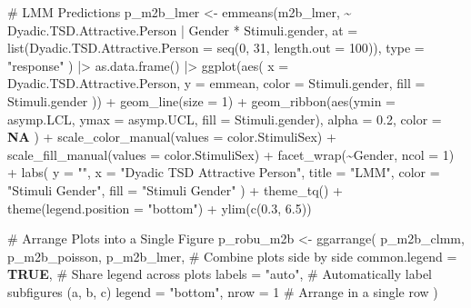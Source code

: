 \documentclass[
  bookmarksnumbered]{article}
\newenvironment{Shaded}{\begin{snugshade}}{\end{snugshade}}
\newcommand{\AttributeTok}[1]{\textcolor[rgb]{0.80,0.80,0.80}{#1}}
\newcommand{\CommentTok}[1]{\textcolor[rgb]{0.50,0.62,0.50}{#1}}
\newcommand{\ConstantTok}[1]{\textcolor[rgb]{0.86,0.64,0.64}{\textbf{#1}}}
\newcommand{\DecValTok}[1]{\textcolor[rgb]{0.86,0.86,0.80}{#1}}
\newcommand{\FloatTok}[1]{\textcolor[rgb]{0.75,0.75,0.82}{#1}}
\newcommand{\FunctionTok}[1]{\textcolor[rgb]{0.94,0.94,0.56}{#1}}
\newcommand{\NormalTok}[1]{\textcolor[rgb]{0.80,0.80,0.80}{#1}}
\newcommand{\OtherTok}[1]{\textcolor[rgb]{0.94,0.94,0.56}{#1}}
\newcommand{\SpecialCharTok}[1]{\textcolor[rgb]{0.86,0.64,0.64}{#1}}
\newcommand{\StringTok}[1]{\textcolor[rgb]{0.80,0.58,0.58}{#1}}
\begin{document}
\begin{Shaded}
\begin{Highlighting}[]
\CommentTok{\# LMM Predictions}
\NormalTok{p\_m2b\_lmer }\OtherTok{\textless{}{-}} \FunctionTok{emmeans}\NormalTok{(m2b\_lmer, }\SpecialCharTok{\textasciitilde{}}\NormalTok{ Dyadic.TSD.Attractive.Person }\SpecialCharTok{|}\NormalTok{ Gender }\SpecialCharTok{*}\NormalTok{ Stimuli.gender,}
  \AttributeTok{at =} \FunctionTok{list}\NormalTok{(}\AttributeTok{Dyadic.TSD.Attractive.Person =} \FunctionTok{seq}\NormalTok{(}\DecValTok{0}\NormalTok{, }\DecValTok{31}\NormalTok{, }\AttributeTok{length.out =} \DecValTok{100}\NormalTok{)),}
  \AttributeTok{type =} \StringTok{"response"}
\NormalTok{) }\SpecialCharTok{|\textgreater{}}
  \FunctionTok{as.data.frame}\NormalTok{() }\SpecialCharTok{|\textgreater{}}
  \FunctionTok{ggplot}\NormalTok{(}\FunctionTok{aes}\NormalTok{(}
    \AttributeTok{x =}\NormalTok{ Dyadic.TSD.Attractive.Person, }\AttributeTok{y =}\NormalTok{ emmean,}
    \AttributeTok{color =}\NormalTok{ Stimuli.gender, }\AttributeTok{fill =}\NormalTok{ Stimuli.gender}
\NormalTok{  )) }\SpecialCharTok{+}
  \FunctionTok{geom\_line}\NormalTok{(}\AttributeTok{size =} \DecValTok{1}\NormalTok{) }\SpecialCharTok{+}
  \FunctionTok{geom\_ribbon}\NormalTok{(}\FunctionTok{aes}\NormalTok{(}\AttributeTok{ymin =}\NormalTok{ asymp.LCL, }\AttributeTok{ymax =}\NormalTok{ asymp.UCL, }\AttributeTok{fill =}\NormalTok{ Stimuli.gender),}
    \AttributeTok{alpha =} \FloatTok{0.2}\NormalTok{, }\AttributeTok{color =} \ConstantTok{NA}
\NormalTok{  ) }\SpecialCharTok{+}
  \FunctionTok{scale\_color\_manual}\NormalTok{(}\AttributeTok{values =}\NormalTok{ color.StimuliSex) }\SpecialCharTok{+}
  \FunctionTok{scale\_fill\_manual}\NormalTok{(}\AttributeTok{values =}\NormalTok{ color.StimuliSex) }\SpecialCharTok{+}
  \FunctionTok{facet\_wrap}\NormalTok{(}\SpecialCharTok{\textasciitilde{}}\NormalTok{Gender, }\AttributeTok{ncol =} \DecValTok{1}\NormalTok{) }\SpecialCharTok{+}
  \FunctionTok{labs}\NormalTok{(}
    \AttributeTok{y =} \StringTok{""}\NormalTok{, }\AttributeTok{x =} \StringTok{"Dyadic TSD Attractive Person"}\NormalTok{,}
    \AttributeTok{title =} \StringTok{"LMM"}\NormalTok{, }\AttributeTok{color =} \StringTok{"Stimuli Gender"}\NormalTok{, }\AttributeTok{fill =} \StringTok{"Stimuli Gender"}
\NormalTok{  ) }\SpecialCharTok{+}
  \FunctionTok{theme\_tq}\NormalTok{() }\SpecialCharTok{+}
  \FunctionTok{theme}\NormalTok{(}\AttributeTok{legend.position =} \StringTok{"bottom"}\NormalTok{) }\SpecialCharTok{+}
  \FunctionTok{ylim}\NormalTok{(}\FunctionTok{c}\NormalTok{(}\FloatTok{0.3}\NormalTok{, }\FloatTok{6.5}\NormalTok{))}

\CommentTok{\# Arrange Plots into a Single Figure}
\NormalTok{p\_robu\_m2b }\OtherTok{\textless{}{-}} \FunctionTok{ggarrange}\NormalTok{(}
\NormalTok{  p\_m2b\_clmm, p\_m2b\_poisson, p\_m2b\_lmer, }\CommentTok{\# Combine plots side by side}
  \AttributeTok{common.legend =} \ConstantTok{TRUE}\NormalTok{, }\CommentTok{\# Share legend across plots}
  \AttributeTok{labels =} \StringTok{"auto"}\NormalTok{, }\CommentTok{\# Automatically label subfigures (a, b, c)}
  \AttributeTok{legend =} \StringTok{"bottom"}\NormalTok{,}
  \AttributeTok{nrow =} \DecValTok{1} \CommentTok{\# Arrange in a single row}
\NormalTok{)}


\end{Highlighting}
\end{Shaded}
\end{document}
